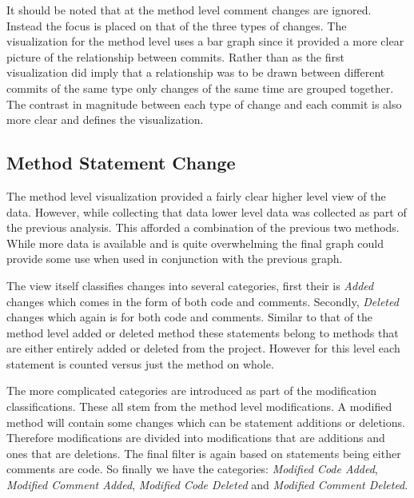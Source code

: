 It should be noted that at the method level comment changes are ignored. Instead the focus is placed on that of the three types of changes. The visualization for the method level uses a bar graph since it provided a more clear picture of the relationship between commits. Rather than as the first visualization did imply that a relationship was to be drawn between different commits of the same type only changes of the same time are grouped together. The contrast in magnitude between each type of change and each commit is also more clear and defines the visualization.


\subsection{Method Statement Change}

The method level visualization provided a fairly clear higher level view of the data. However, while collecting that data lower level data was collected as part of the previous analysis. This afforded a combination of the previous two methods. While more data is available and is quite overwhelming the final graph could provide some use when used in conjunction with the previous graph.

The view itself classifies changes into several categories, first their is \textit{Added} changes which comes in the form of both code and comments. Secondly, \textit{Deleted} changes which again is for both code and comments. Similar to that of the method level added or deleted method these statements belong to methods that are either entirely added or deleted from the project. However for this level each statement is counted versus just the method on whole.

The more complicated categories are introduced as part of the modification classifications. These all stem from the method level modifications. A modified method will contain some changes which can be statement additions or deletions. Therefore modifications are divided into modifications that are additions and ones that are deletions. The final filter is again based on statements being either comments are code. So finally we have the categories: \textit{Modified Code Added}, \textit{Modified Comment Added}, \textit{Modified Code Deleted} and \textit{Modified Comment Deleted}.


